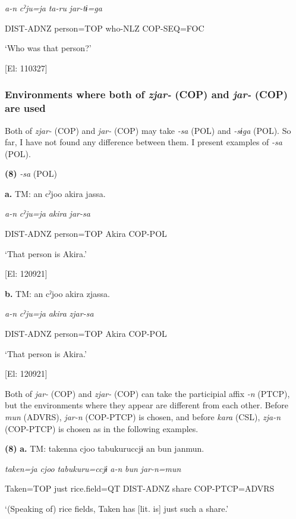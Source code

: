       \textit{a-n}  \textit{cˀju=ja}  \textit{ta-ru}  \textit{jar-tɨ=ga}

      DIST-ADNZ  person=TOP  who-NLZ  COP-SEQ=FOC

      ‘Who was that person?’

      [El: 110327]

\subsubsection{Environments where both of \textit{zjar-} (COP) and \textit{jar-} (COP) are used}

Both of \textit{zjar-} (COP) and \textit{jar-} (COP) may take \textit{{}-sa} (POL) and \textit{{}-sɨga} (POL). So far, I have not found any difference between them. I present examples of \textit{{}-sa} (POL).

\textbf{(8)}  \textit{{}-sa} (POL)

  \textbf{a.}  TM:  an  cˀjoo  akira  jassa.

      \textit{a-n}  \textit{cˀju=ja}  \textit{akira}  \textit{jar-sa}

      DIST-ADNZ  person=TOP  Akira  COP-POL

      ‘That person is Akira.’

      [El: 120921]

  \textbf{b.}  TM:  an  cˀjoo  akira  zjassa.

      \textit{a-n}  \textit{cˀju=ja}  \textit{akira}  \textit{zjar-sa}

      DIST-ADNZ  person=TOP  Akira  COP-POL

      ‘That person is Akira.’

      [El: 120921]

Both of \textit{jar-} (COP) and \textit{zjar-} (COP) can take the participial affix \textit{{}-n} (PTCP), but the environments where they appear are different from each other. Before \textit{mun} (ADVRS), \textit{jar-n} (COP-PTCP) is chosen, and before \textit{kara} (CSL), \textit{zja-n} (COP-PTCP) is chosen as in the following examples.

\textbf{(8)}  \textbf{a.}  TM:  takenna  cjoo  tabukuruccjɨ  an  bun  janmun.

      \textit{taken=ja}  \textit{cjoo}  \textit{tabukuru=ccjɨ}  \textit{a-n}  \textit{bun}  \textit{jar-n=mun}

      Taken=TOP  just  rice.field=QT  DIST-ADNZ  share  COP-PTCP=ADVRS

      ‘(Speaking of) rice fields, Taken has [lit. is] just such a share.’

